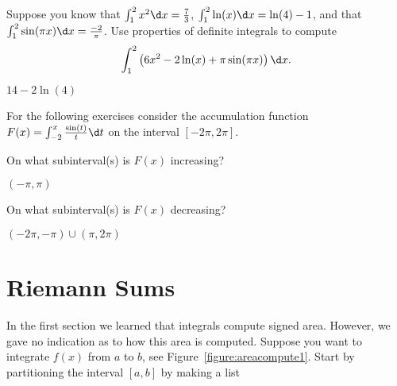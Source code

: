 \begin{exercises}
\begin{exercise}
Suppose you know that $\int_{1}^2 x^2 \d x = \frac{7}{3}$, $\int_1^2
\ln(x)\d x = \ln(4) - 1$, and that $\int_1^2 \sin(\pi x) \d x =
\frac{-2}{\pi}$. Use properties of definite integrals to compute
\[
\int_1^2 \left(6 x^2  - 2 \ln(x) +\pi \sin(\pi x) \right) \d x.
\]
\begin{answer}
$14 -2 \ln(4)$
\end{answer}
\end{exercise}


\noindent For the following exercises consider the accumulation
function $F(x) = \int_{-2}^x \frac{\sin(t)}{t} \d t$ on the interval
$[-2\pi,2\pi]$.

\begin{exercise} On what subinterval(s) is $F(x)$ increasing?
\begin{answer}
$(-\pi,\pi)$
\end{answer}
\end{exercise}

\begin{exercise} On what subinterval(s) is $F(x)$ decreasing?
\begin{answer}
$(-2\pi,-\pi)\cup(\pi,2\pi)$
\end{answer}
\end{exercise}

\end{exercises}




\section{Riemann Sums}

In the first section we learned that integrals compute signed
area. However, we gave no indication as to how this area is
computed. Suppose you want to integrate $f(x)$ from $a$ to $b$, see
Figure~\ref{figure:areacompute1}. Start by partitioning the interval
$[a,b]$ by making a list

